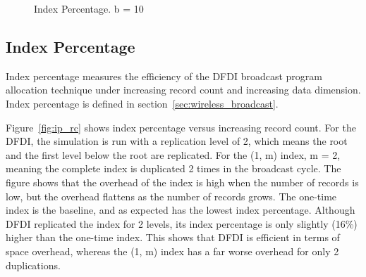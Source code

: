 \begin{figure}
  \centering
  \caption{\small Index Percentage. b = 10}
  \label{fig:ip}
\end{figure}


\subsection{Index Percentage}

Index percentage measures the efficiency of the DFDI broadcast program
allocation technique under increasing record count and increasing data
dimension. Index percentage is defined in
section~\ref{sec:wireless_broadcast}.

Figure~\ref{fig:ip_rc} shows index percentage versus increasing
record count. For the DFDI, the simulation is run with a
replication level of 2, which means the root and the first level
below the root are replicated. For the (1, m) index, m = 2,
meaning the complete index is duplicated 2 times in the broadcast
cycle. The figure shows that the overhead of the index is high
when the number of records is low, but the overhead flattens as
the number of records grows. The one-time index is the baseline,
and as expected has the lowest index percentage. Although DFDI
replicated the index for 2 levels, its index percentage is only
slightly (16\%) higher than the one-time index. This shows that
DFDI is efficient in terms of space overhead, whereas the (1, m)
index has a far worse overhead for only 2 duplications.


